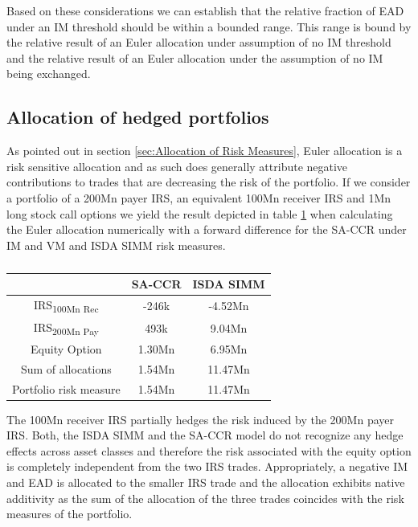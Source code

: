 \documentclass[../Thesis_AHoecherl.tex]{subfiles}
\begin{document}
    Based on these considerations we can establish that the relative fraction of EAD under an IM threshold should be within a bounded range. 
    This range is bound by the relative result of an Euler allocation under assumption of no IM threshold and the relative result of an Euler allocation under the assumption of no IM being exchanged.
    
    \subsection{Allocation of hedged portfolios\label{sec:Allocation of hedged portfolios}}
    
    As pointed out in section \ref{sec:Allocation of Risk Measures}, Euler allocation is a risk sensitive allocation and as such does generally attribute negative contributions to trades that are decreasing the risk of the portfolio. If we consider a portfolio of a 200Mn payer IRS, an equivalent 100Mn receiver IRS and 1Mn long stock call options we yield the result depicted in table \ref{tab:hedge trade sample results} when calculating the Euler allocation numerically with a forward difference for the SA-CCR under IM and VM and ISDA SIMM risk measures.
    \begin{table}[htbp]
        \centering
        \begin{tabular}{c|c|c}
            & SA-CCR & ISDA SIMM \\
            \toprule
            IRS\textsubscript{100Mn Rec} & -246k & -4.52Mn \\
            \midrule
            IRS\textsubscript{200Mn Pay} & 493k & 9.04Mn \\
            \midrule
            Equity Option & 1.30Mn & 6.95Mn \\
            \bottomrule
            Sum of allocations & 1.54Mn & 11.47Mn \\
            \midrule
            Portfolio risk measure & 1.54Mn & 11.47Mn \\
        \end{tabular}%
        \caption{}
        \label{tab:hedge trade sample results}
    \end{table}
    The 100Mn receiver IRS partially hedges the risk induced by the 200Mn payer IRS. 
    Both, the ISDA SIMM and the SA-CCR model do not recognize any hedge effects across asset classes and therefore the risk associated with the equity option is completely independent from the two IRS trades. 
    Appropriately, a negative IM and EAD is allocated to the smaller IRS trade and the allocation exhibits native additivity as the sum of the allocation of the three trades coincides with the risk measures of the portfolio.
    
\end{document}
